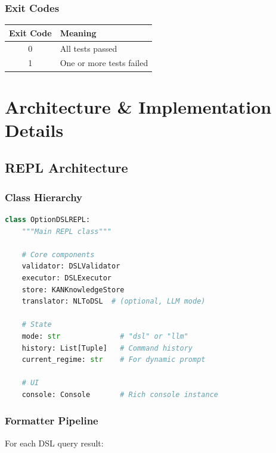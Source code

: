 \documentclass[12pt,oneside,openany]{book}
\begin{document}
\subsection{Exit Codes}

\begin{table}[H]
\centering
\begin{tabular}{|c|l|}
\toprule
\textbf{Exit Code} & \textbf{Meaning} \\
\midrule
0 & All tests passed \\
1 & One or more tests failed \\
\bottomrule
\end{tabular}
\end{table}

\chapter{Architecture \& Implementation Details}

\section{REPL Architecture}

\subsection{Class Hierarchy}

\begin{lstlisting}[language=Python]
class OptionDSLREPL:
    """Main REPL class"""

    # Core components
    validator: DSLValidator
    executor: DSLExecutor
    store: KANKnowledgeStore
    translator: NLToDSL  # (optional, LLM mode)

    # State
    mode: str              # "dsl" or "llm"
    history: List[Tuple]   # Command history
    current_regime: str    # For dynamic prompt

    # UI
    console: Console       # Rich console instance
\end{lstlisting}

\subsection{Formatter Pipeline}

For each DSL query result:
\end{document}
